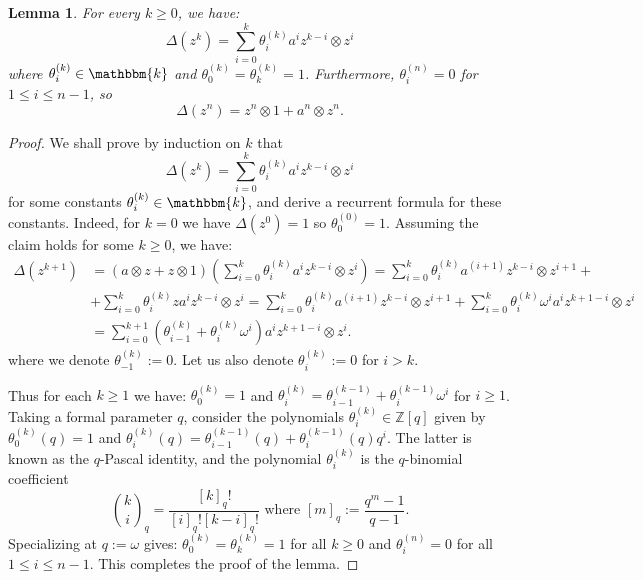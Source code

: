 \documentclass{amsart}
\theoremstyle{plain}%
\newtheorem{lemma}{Lemma}[subsection]
\theoremstyle{remark}
\newcommand{\1}{\mathbbm{1}}
\newcommand{\Z}{\mathbb{Z}}
\begin{document}
        \begin{lemma}\label{lemma: delta z^r}
            For every $k\geq 0$, we have:
            $$
                \Delta(z^k) = \sum_{i=0}^{k} \theta^{(k)}_i a^{i}z^{k-i}\otimes z^i
            $$
            where $\theta^{(k)}_i \in \mathbbm{k}$ and $ \theta^{(k)}_0= \theta^{(k)}_k=1$. Furthermore, $\theta^{(n)}_i=0$ for $1\leq i\leq n-1$, so $$\Delta(z^n)=z^n\otimes 1+a^{n}\otimes z^n.$$
        \end{lemma}
        \begin{proof}
            We shall prove by induction on $k$ that
            $$  \Delta(z^k) = \sum_{i=0}^{k} \theta^{(k)}_i a^{i}z^{k-i}\otimes z^i$$ for some constants $\theta^{(k)}_i\in \mathbbm{k}$, and derive a recurrent formula for these constants. Indeed, for $k=0$ we have $\Delta(z^0)=1$ so $\theta^{(0)}_0=1$. Assuming the claim holds for some $k\geq 0$, we have:
            \begin{align*}     
                \Delta(z^{k+1}) &= (a\otimes z+z\otimes 1)\left(\sum_{i=0}^{k} \theta^{(k)}_i a^{i}z^{k-i}\otimes z^i\right) = \sum_{i=0}^{k} \theta^{(k)}_i a^{(i+1)}z^{k-i}\otimes z^{i+1} +\\&+\sum_{i=0}^{k} \theta^{(k)}_i za^{i}z^{k-i}\otimes z^{i} = \sum_{i=0}^{k} \theta^{(k)}_i a^{(i+1)}z^{k-i}\otimes z^{i+1} +\sum_{i=0}^{k} \theta^{(k)}_i \omega^{i} a^{i}z^{k+1-i}\otimes z^{i} \\
                &=  \sum_{i=0}^{k+1} \left(\theta^{(k)}_{i-1}+\theta^{(k)}_i \omega^{i}\right) a^{i}z^{k+1-i}\otimes z^{i}  .
            \end{align*}
            where we denote $\theta^{(k)}_{-1}:=0$. Let us also denote $\theta^{(k)}_i:=0$ for $i>k$.

            Thus for each $k\geq 1$ we have: $\theta^{(k)}_0=1$ and  $\theta^{(k)}_i= \theta^{(k-1)}_{i-1}+\theta^{(k-1)}_i \omega^{i}$ for $i\geq 1$. Taking a formal parameter $q$, consider the polynomials $\theta^{(k)}_i\in \Z[q]$ given by $\theta^{(k)}_0(q)=1$ and  $\theta^{(k)}_i(q)= \theta^{(k-1)}_{i-1}(q)+\theta^{(k-1)}_i(q) q^{i}$. The latter is known as the $q$-Pascal identity, and
           the polynomial $\theta^{(k)}_i$ is the $q$-binomial coefficient $$\binom{k}{i}_q=\frac{[k]_q!}{[i]_q! [k-i]_q!} \text{ where } [m]_q:=\frac{q^m-1}{q-1}.$$
            Specializing at $q:=\omega$ gives:   $\theta^{(k)}_0=\theta^{(k)}_k=1$ for all $k\geq 0$ and $\theta^{(n)}_i=0$ for all $1\leq i\leq n-1$. This completes the proof of the lemma.
        \end{proof}
\end{document}
